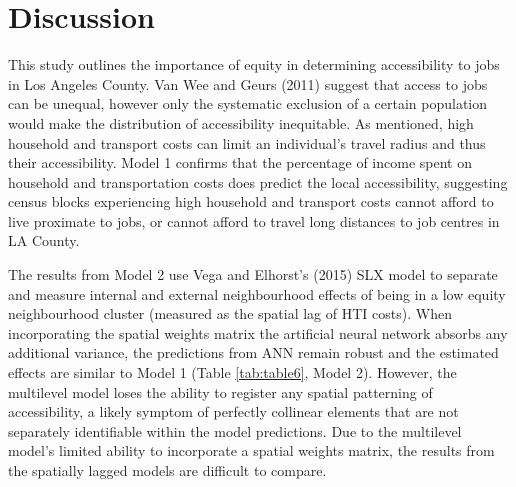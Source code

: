 \documentclass[a4paper,UKenglish]{lipics-v2018}
\begin{document}
\pagebreak
\section{Discussion}
This study outlines the importance of equity in determining accessibility to jobs in Los Angeles County. Van Wee and Geurs (2011) suggest that access to jobs can be unequal, however only the systematic exclusion of a certain population would make the distribution of accessibility inequitable. As mentioned, high household and transport costs can limit an individual’s travel radius and thus their accessibility. Model 1 confirms that the percentage of income spent on household and transportation costs does predict the local accessibility, suggesting census blocks experiencing high household and transport costs cannot afford to live proximate to jobs, or cannot afford to travel long distances to job centres in LA County. 

The results from Model 2 use Vega and Elhorst’s (2015) SLX model to separate and measure internal and external neighbourhood effects of being in a low equity neighbourhood cluster (measured as the spatial lag of HTI costs). When incorporating the spatial weights matrix the artificial neural network absorbs any additional variance, the predictions from ANN remain robust and the estimated effects are similar to Model 1 (Table \ref{tab:table6}, Model 2). However, the multilevel model loses the ability to register any spatial patterning of accessibility, a likely symptom of perfectly collinear elements that are not separately identifiable within the model predictions. Due to the multilevel model's limited ability to incorporate a spatial weights matrix, the results from the spatially lagged models are difficult to compare. 
\end{document}
